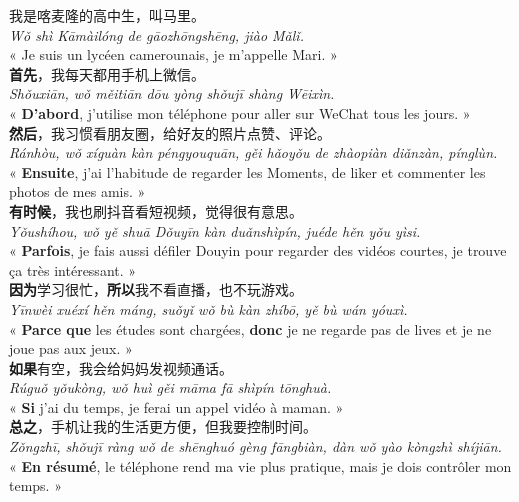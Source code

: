 \documentclass[11pt]{article}
\begin{document}
\begin{textebox}
我是喀麦隆的高中生，叫马里。\\
\emph{Wǒ shì Kāmàilóng de gāozhōngshēng, jiào Mǎlǐ.}\\
« Je suis un lycéen camerounais, je m'appelle Mari. »\\[4pt]
\textbf{首先}，我每天都用手机上微信。\\
\emph{Shǒuxiān, wǒ měitiān dōu yòng shǒujī shàng Wēixìn.}\\
« \textbf{D'abord}, j'utilise mon téléphone pour aller sur WeChat tous les jours. »\\[4pt]
\textbf{然后}，我习惯看朋友圈，给好友的照片点赞、评论。\\
\emph{Ránhòu, wǒ xíguàn kàn péngyouquān, gěi hǎoyǒu de zhàopiàn diǎnzàn, pínglùn.}\\
« \textbf{Ensuite}, j'ai l'habitude de regarder les Moments, de liker et commenter les photos de mes amis. »\\[4pt]
\textbf{有时候}，我也刷抖音看短视频，觉得很有意思。\\
\emph{Yǒushíhou, wǒ yě shuā Dǒuyīn kàn duǎnshìpín, juéde hěn yǒu yìsi.}\\
« \textbf{Parfois}, je fais aussi défiler Douyin pour regarder des vidéos courtes, je trouve ça très intéressant. »\\[4pt]
\textbf{因为}学习很忙，\textbf{所以}我不看直播，也不玩游戏。\\
\emph{Yīnwèi xuéxí hěn máng, suǒyǐ wǒ bù kàn zhíbō, yě bù wán yóuxì.}\\
« \textbf{Parce que} les études sont chargées, \textbf{donc} je ne regarde pas de lives et je ne joue pas aux jeux. »\\[4pt]
\textbf{如果}有空，我会给妈妈发视频通话。\\
\emph{Rúguǒ yǒukòng, wǒ huì gěi māma fā shìpín tōnghuà.}\\
« \textbf{Si} j'ai du temps, je ferai un appel vidéo à maman. »\\[4pt]
\textbf{总之}，手机让我的生活更方便，但我要控制时间。\\
\emph{Zǒngzhī, shǒujī ràng wǒ de shēnghuó gèng fāngbiàn, dàn wǒ yào kòngzhì shíjiān.}\\
« \textbf{En résumé}, le téléphone rend ma vie plus pratique, mais je dois contrôler mon temps. »
\end{textebox}
\end{document}
